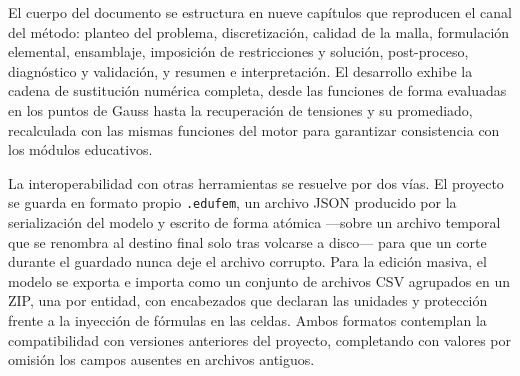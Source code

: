 El cuerpo del documento se estructura en nueve capítulos que reproducen el canal del método: planteo del problema, discretización, calidad de la malla, formulación elemental, ensamblaje, imposición de restricciones y solución, post-proceso, diagnóstico y validación, y resumen e interpretación. El desarrollo exhibe la cadena de sustitución numérica completa, desde las funciones de forma evaluadas en los puntos de Gauss hasta la recuperación de tensiones y su promediado, recalculada con las mismas funciones del motor para garantizar consistencia con los módulos educativos.

La interoperabilidad con otras herramientas se resuelve por dos vías. El proyecto se guarda en formato propio \texttt{.edufem}, un archivo JSON producido por la serialización del modelo y escrito de forma atómica —sobre un archivo temporal que se renombra al destino final solo tras volcarse a disco— para que un corte durante el guardado nunca deje el archivo corrupto. Para la edición masiva, el modelo se exporta e importa como un conjunto de archivos CSV agrupados en un ZIP, una por entidad, con encabezados que declaran las unidades y protección frente a la inyección de fórmulas en las celdas. Ambos formatos contemplan la compatibilidad con versiones anteriores del proyecto, completando con valores por omisión los campos ausentes en archivos antiguos.
